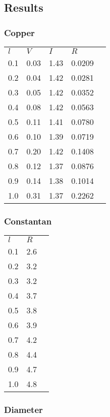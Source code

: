 \documentclass{article}
\begin{document}
\subsection{Results}

\subsubsection{Copper}

\begin{center}
\begin{tabular}{l|l|l|ll}
$l$ & $V$  & $I$  & $R$ &  \\ \cline{1-4}
0.1 & 0.03 & 1.43 & 0.0209 & \\
0.2 & 0.04 & 1.42 & 0.0281 & \\
0.3 & 0.05 & 1.42 & 0.0352 & \\
0.4 & 0.08 & 1.42 & 0.0563 & \\
0.5 & 0.11 & 1.41 & 0.0780 & \\
0.6 & 0.10 & 1.39 & 0.0719 & \\
0.7 & 0.20 & 1.42 & 0.1408 & \\
0.8 & 0.12 & 1.37 & 0.0876 & \\
0.9 & 0.14 & 1.38 & 0.1014 & \\
1.0 & 0.31 & 1.37 & 0.2262 & 
\end{tabular}
\end{center}

\subsubsection{Constantan}

\begin{center}
\begin{tabular}{l|ll}
$l$ & $R$ &  \\ \cline{1-2}
0.1 & 2.6 & \\
0.2 & 3.2 & \\
0.3 & 3.2 & \\
0.4 & 3.7 & \\
0.5 & 3.8 & \\
0.6 & 3.9 & \\
0.7 & 4.2 & \\
0.8 & 4.4 & \\
0.9 & 4.7 & \\
1.0 & 4.8 & 
\end{tabular}
\end{center}

\subsubsection{Diameter}
\end{document}

